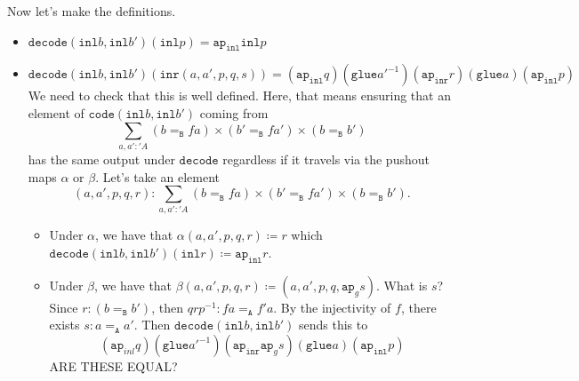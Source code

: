 \documentclass[12pt]{amsart}
\newcommand{\type}[1]{\mathtt{#1}}
\newcommand{\A}{\type{A}}
\newcommand{\B}{\type{B}}
\newcommand{\ap}{\type{ap}}
\newcommand{\inl}{\type{inl}}
\newcommand{\inr}{\type{inr}}
\newcommand{\glue}{\type{glue}}
\newcommand{\code}{\type{code}}
\newcommand{\decode}{\type{decode}}
\theoremstyle{remark}
\theoremstyle{definition}
\begin{document}
Now let's make the definitions.
\begin{itemize}
	\item $ \decode ( \inl b , \inl b' ) (\inl p) = \ap_{\inl} \inl p$
	\item $ \decode ( \inl b , \inl b' ) (\inr (a,a',p,q,s)) = 
		(\ap_{\inl} q) (\glue a'^{-1}) (\ap_{\inr} r) (\glue a) ( \ap_{\inl} p)$
		We need to check that this is well defined.  Here, that means ensuring that an element of $ \code (\inl b , \inl b') $ coming from 
		\[
		\sum_{a,a' : 'A} 
			(b =_{\B} fa) \times 
			(b' =_{\B} fa') \times 
			(b =_{\B} b')
		\]
		has the same output under $ \decode $ regardless if it travels via the pushout maps $ \alpha $ or $ \beta $.  Let's take an element
		\[
		(a,a',p,q,r) :
			\sum_{a,a' : 'A} 
			(b =_{\B} fa) \times 
			(b' =_{\B} fa') \times 
			(b =_{\B} b').
		\]
		\begin{itemize}
			\item Under $ \alpha $, we have that $ \alpha (a,a',p,q,r) \coloneqq r $ which $ \decode (\inl b , \inl b') (\inl r) \coloneqq \ap_{\inl} r$.
			\item Under $ \beta $, we have that $ \beta (a,a',p,q,r) \coloneqq (a,a',p,q, \ap_g s) $.  What is $ s $? Since $ r : (b =_{\B} b') $, then $ qrp^{-1} : fa =_{\A} f'a $. By the injectivity of $ f $, there exists $ s : a =_{\A} a' $.   Then $ \decode (\inl b , \inl b') $ sends this to 
			\[
			( \ap_{inl} q )( \glue a'^{-1} )( \ap_{\inr} \ap_{g} s )( \glue a )( \ap_{\inl} p )
			\]
			{\color{red}ARE THESE EQUAL?}
		\end{itemize}
		
		
		
		
\end{itemize} 







\end{document}
